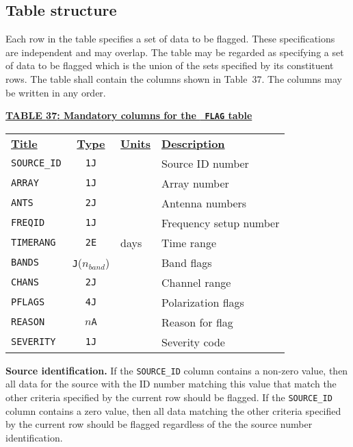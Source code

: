 \documentclass[twoside]{article}
\newcommand{\Hi}[1]{\textcolor{hicol}{#1}}
\newcommand{\nband}{$n_{band}$}
\begin{document}
\subsection{Table structure}

Each row in the table specifies a set of data to be flagged.  These
specifications are independent and may overlap.  The table may be
regarded as specifying a set of data to be flagged which is the union
of the sets specified by its constituent rows.  The table shall
contain the columns shown in Table~\Hi{37}.  The columns may be
written in any order.

\begin{center}
\underline{\bf{TABLE \Hi{37}: Mandatory columns for the {\tt
      FLAG} table}}\\
\begin{tabular}{lcll}
\noalign{\vspace{2pt}}
\underline{{\bf Title\vphantom{y}}} & \underline{\bf{Type}} &
   \underline{{\bf Units\vphantom{y}}} & \underline{\bf{Description}} \\
\noalign{\vspace{2pt}}
{\tt SOURCE\_ID}  & {\tt 1J} &      & Source ID number \\
{\tt ARRAY}       & {\tt 1J} &      & Array number \\
{\tt ANTS}        & {\tt 2J} &      & Antenna numbers \\
{\tt FREQID}      & {\tt 1J} &      & Frequency setup number \\
{\tt TIMERANG}    & {\tt 2E} & days & Time range \\
{\tt BANDS}       & {\tt J}(\nband) &  & Band flags \\
{\tt CHANS}       & {\tt 2J} &      & Channel range \\
{\tt PFLAGS}      & {\tt 4J} &      & Polarization flags \\
{\tt REASON}      & \Hi{{\tt $n$A}} &    & Reason for flag \\
{\tt SEVERITY}    & {\tt 1J} &      & Severity code
\end{tabular}
\end{center}

{\bf Source identification.}  If the {\tt SOURCE\_ID} column contains
a non-zero value, then all data for the source with the ID number
matching this value that match the other criteria specified by the
current \Hi{row} should be flagged.  \Hi{If the {\tt SOURCE\_ID}
column contains a zero value,} then all data matching the other
criteria specified by the current \Hi{row} should be flagged
regardless of the the source number identification.
\end{document}
